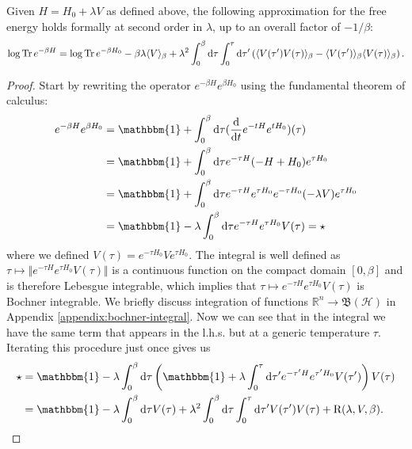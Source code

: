 \begin{proposition}
	\label{prop:duhamel}
	Given $H = H_0 + \lambda V$ as defined above, the following approximation for the free
	energy holds formally at second order in $\lambda$, up to an overall factor of $-1/\beta$:
	\begin{align}
		\mathrm{log}\,\mathrm{Tr}\,e^{-\beta H}
		= \mathrm{log}\,\mathrm{Tr}\,e^{-\beta H_0}-\beta\lambda\langle V\rangle_\beta
		+\lambda^2\int_0^\beta\mathrm{d}\tau \int_0^\tau\mathrm{d}\tau' \left(
			\langle V(\tau')V(\tau)\rangle_\beta-\langle V(\tau')\rangle_\beta\langle V(\tau) \rangle_\beta
		\right).
	\end{align}
\end{proposition}
\begin{proof}
	Start by rewriting the operator $e^{-\beta H}e^{\beta H_0}$ using the
	fundamental theorem of calculus:
	\begin{align*}
		e^{-\beta H}e^{\beta H_0}
		&= \mathbbm{1}
			+ \int_0^\beta\dx\tau
			(\frac{\dx}{\dx t}e^{-t H}e^{t H_0})(\tau)\\
		&= \mathbbm{1}
			+ \int_0^\beta\dx\tau
			e^{-\tau H}(-H+H_0)e^{\tau H_0}\\
		&= \mathbbm{1}
			+ \int_0^\beta\dx\tau
			e^{-\tau H}e^{\tau H_0}e^{-\tau H_0}(-\lambda V)e^{\tau H_0}\\
		&= \mathbbm{1}
			- \lambda\int_0^\beta\dx\tau
			e^{-\tau H}e^{\tau H_0}V(\tau) = \star
	\end{align*}
	where we defined $V(\tau)=e^{-\tau H_0}Ve^{\tau H_0}$. The integral is well
	defined as $\tau\mapsto\Vert e^{-\tau H}e^{\tau H_0}V(\tau)\Vert$ is a continuous function
	on the compact domain $[0,\beta]$ and is therefore Lebesgue integrable, which implies that
	$\tau\mapsto e^{-\tau H}e^{\tau H_0}V(\tau)$ is Bochner integrable. We briefly discuss
	integration of functions $\mathbb{R}^n\to\mathfrak{B}(\mathcal{H})$ in Appendix
	\ref{appendix:bochner-integral}. Now we can see that in the integral we have the same term
	that appears in the l.h.s. but at a generic temperature $\tau$. Iterating this procedure
	just once gives us
	\begin{align*}
		\star &= \mathbbm{1}
				- \lambda\int_0^\beta\dx\tau
				\left(
				\mathbbm{1} + \lambda\int_0^\tau\dx\tau'e^{-\tau' H}e^{\tau' H_0}V(\tau')
				\right)V(\tau) \\
			  &= \mathbbm{1} - \lambda\int_0^\beta\dx\tau V(\tau)
				+ \lambda^2\int_0^\beta\dx\tau \int_0^\tau\dx\tau' V(\tau')V(\tau)
				+ \mathrm{R}(\lambda,V,\beta).
	\end{align*}

\end{proof}
